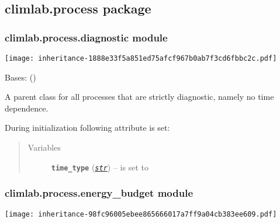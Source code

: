\documentclass[a4paper,10pt,english]{sphinxmanual}
\begin{document}
\subsection{climlab.process package}
\label{api/climlab.process:climlab-process-package}\label{api/climlab.process::doc}

\subsubsection{climlab.process.diagnostic module}
\label{api/climlab.process:climlab-process-diagnostic-module}
\texttt{[image: inheritance-1888e33f5a851ed75afcf967b0ab7f3cd6fbbc2c.pdf]}
\label{api/climlab.process:module-climlab.process.diagnostic}

\begin{fulllineitems}
\label{api/climlab.process:climlab.process.diagnostic.DiagnosticProcess}
Bases: {\hyperref[api/climlab.process:climlab.process.time_dependent_process.TimeDependentProcess]{\emph{}}} ()

A parent class for all processes that are strictly diagnostic, namely
no time dependence.

During initialization following attribute is set:
\begin{quote}\begin{description}
\item[{Variables}] \leavevmode
\textbf{\texttt{time\_type}} (\href{http://docs.python.org/2.7/library/functions.html\#str}{\emph{\texttt{str}}}) -- is set to 

\end{description}\end{quote}

\end{fulllineitems}



\subsubsection{climlab.process.energy\_budget module}
\label{api/climlab.process:climlab-process-energy-budget-module}
\texttt{[image: inheritance-98fc96005ebee865666017a7ff9a04cb383ee609.pdf]}
\label{api/climlab.process:module-climlab.process.energy_budget}
\end{document}
